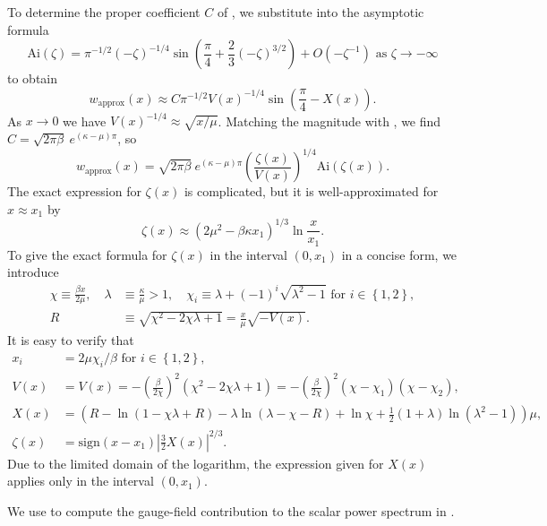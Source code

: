 To determine the proper coefficient $C$ of , we substitute into  the asymptotic formula 
\[
\mathrm{Ai}(\zeta)=\pi^{-1/2}(-\zeta)^{-1/4}\sin\left(\frac{\pi}{4}+\frac{2}{3}(-\zeta)^{3/2}\right)+O(-\zeta^{-1})\textrm{ as }\zeta\to-\infty
\]
 to obtain 
\[
w_{\textrm{approx}}(x)\approx C\pi^{-1/2}V(x)^{-1/4}\sin\left(\frac{\pi}{4}-X(x)\right).
\]
 As $x\to0$ we have $V(x)^{-1/4}\approx\sqrt{x/\mu}$. Matching the magnitude with , we find $C=\sqrt{2\pi\beta}\ e^{(\kappa-\mu)\pi}$, so 
\begin{equation}
w_{\textrm{approx}}(x)=\sqrt{2\pi\beta}\ e^{(\kappa-\mu)\pi}\left(\frac{\zeta(x)}{V(x)}\right)^{1/4}\mathrm{Ai}\left(\zeta(x)\right).\label{eq:airy-full-approx}
\end{equation}
 The exact expression for $\zeta(x)$ is complicated, but it is well-approximated for $x\approx x_{1}$ by 
\[
\zeta(x)\approx\left(2\mu^{2}-\beta\kappa x_{1}\right)^{1/3}\ln\frac{x}{x_{1}}.
\]
 To give the exact formula for $\zeta(x)$ in the interval $\left(0,x_{1}\right)$ in a concise form, we introduce 
\begin{align*}
\chi\equiv\frac{\beta x}{2\mu},\quad\lambda & \equiv\frac{\kappa}{\mu}>1,\quad\chi_{i}\equiv\lambda+(-1)^{i}\sqrt{\lambda^{2}-1}\textrm{ for }i\in\left\{ 1,2\right\} ,\\
R & \equiv\sqrt{\chi^{2}-2\chi\lambda+1}=\frac{x}{\mu}\sqrt{-V(x)}.
\end{align*}
 It is easy to verify that 
\begin{align*}
x_{i} & =2\mu\chi_{i}/\beta\textrm{ for }i\in\left\{ 1,2\right\} ,\\
V(x) & =V(x)=-\left(\frac{\beta}{2\chi}\right)^{2}\left(\chi^{2}-2\chi\lambda+1\right)=-\left(\frac{\beta}{2\chi}\right)^{2}\left(\chi-\chi_{1}\right)\left(\chi-\chi_{2}\right),\\
X(x) & =\left(R-\ln\left(1-\chi\lambda+R\right)-\lambda\ln\left(\lambda-\chi-R\right)+\ln\chi+\tfrac{1}{2}(1+\lambda)\ln\left(\lambda^{2}-1\right)\right)\mu,\\
\zeta(x) & =\mathrm{sign}(x-x_{1})\left|\tfrac{3}{2}X(x)\right|^{2/3}.
\end{align*}
 Due to the limited domain of the logarithm, the expression given for $X(x)$ applies only in the interval $(0,x_{1})$. 

We use  to compute the gauge-field contribution to the scalar power spectrum in .

 

\textcolor{white}{}
